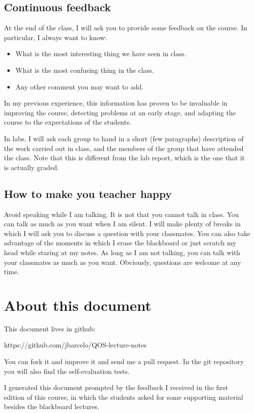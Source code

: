 \subsection{Continuous feedback}
At the end of the class, I will ask you to provide some feedback on the course. 
In particular, I always want to know:
\begin{itemize}
\item What is the most interesting thing we have seen in class.
\item What is the most confusing thing in the class.
\item Any other comment you may want to add.

\end{itemize}

In my previous experience, this information has proven to be invaluable in improving the course, detecting problems at an early stage, and adapting the course to the expectations of the students.

In labs, I will ask each group to hand in a short (few paragraphs) description of the work carried out in class, and the members of the group that have attended the class.
Note that this is different from the lab report, which is the one that it is actually graded.

\subsection{How to make you teacher happy}

Avoid speaking while I am talking.
It is not that you cannot talk in class.
You can talk as much as you want when I am silent.
I will make plenty of breaks in which I will ask you to discuss a question with your classmates.
You can also take advantage of the moments in which I erase the blackboard or just scratch my head while staring at my notes.
As long as I am not talking, you can talk with your classmates as much as you want.
Obviously, questions are welcome at any time.

\section{About this document}

This document lives in github:

https://github.com/jbarcelo/QOS-lecture-notes

You can fork it and improve it and send me a pull request. In the git repository you will also find the self-evaluation tests.

I generated this document prompted by the feedback I received in the first edition of this course, in which the students asked for some supporting material besides the blackboard lectures.
